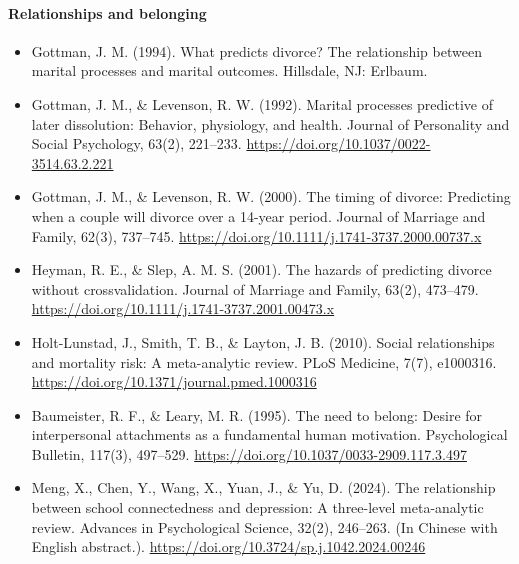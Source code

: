 \documentclass[10pt]{article}
\theoremstyle{remark}
\begin{document}
\paragraph{Relationships and belonging}
\begin{itemize}[leftmargin=1em,itemsep=0pt,topsep=1pt,parsep=0pt]
\item Gottman, J. M. (1994). What predicts divorce? The relationship between marital processes and marital outcomes. Hillsdale, NJ: Erlbaum.
\item Gottman, J. M., \& Levenson, R. W. (1992). Marital processes predictive of later dissolution: Behavior, physiology, and health. Journal of Personality and Social Psychology, 63(2), 221--233. \url{https://doi.org/10.1037/0022-3514.63.2.221}
\item Gottman, J. M., \& Levenson, R. W. (2000). The timing of divorce: Predicting when a couple will divorce over a 14-year period. Journal of Marriage and Family, 62(3), 737--745. \url{https://doi.org/10.1111/j.1741-3737.2000.00737.x}
\item Heyman, R. E., \& Slep, A. M. S. (2001). The hazards of predicting divorce without crossvalidation. Journal of Marriage and Family, 63(2), 473--479. \url{https://doi.org/10.1111/j.1741-3737.2001.00473.x}
\item Holt-Lunstad, J., Smith, T. B., \& Layton, J. B. (2010). Social relationships and mortality risk: A meta-analytic review. PLoS Medicine, 7(7), e1000316. \url{https://doi.org/10.1371/journal.pmed.1000316}
\item Baumeister, R. F., \& Leary, M. R. (1995). The need to belong: Desire for interpersonal attachments as a fundamental human motivation. Psychological Bulletin, 117(3), 497--529. \url{https://doi.org/10.1037/0033-2909.117.3.497}
\item Meng, X., Chen, Y., Wang, X., Yuan, J., \& Yu, D. (2024). The relationship between school connectedness and depression: A three-level meta-analytic review. Advances in Psychological Science, 32(2), 246--263. (In Chinese with English abstract.). \url{https://doi.org/10.3724/sp.j.1042.2024.00246}
\end{itemize}
\end{document}
